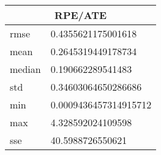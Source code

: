 \begin{table}[!ht] 
 \centering 
 \begin{tabular}{|l|l|} \hline 
 \multicolumn{2}{|c|}{RPE/ATE} \\ \hline 
 rmse & 0.4355621175001618 \\ \hline 
mean & 0.2645319449178734 \\ \hline 
median & 0.190662289541483 \\ \hline 
std & 0.34603064650286686 \\ \hline 
min & 0.0009436457314915712 \\ \hline 
max & 4.328592024109598 \\ \hline 
sse & 40.5988726550621 \\ \hline 
\end{tabular} 
 \end{table}